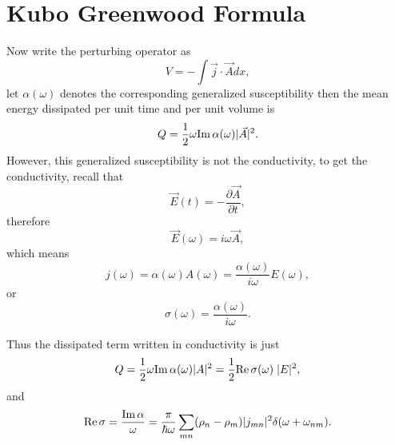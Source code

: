 \documentclass{book}
\renewcommand{\Re}{{\rm Re}}
\renewcommand{\Im}{{\rm Im}}
\numberwithin{equation}{section}
\begin{document}
\section{Kubo Greenwood Formula}
Now write the perturbing operator as
\begin{equation}
  V=-\int\vec{j}\cdot\vec{A}dx,
\end{equation}
let $\alpha(\omega)$ denotes the corresponding generalized
susceptibility then the mean energy dissipated per unit time and per
unit volume is
\begin{equation}
  Q=\frac{1}{2}\omega\Im\,\alpha(\omega)|\vec{A}|^2.
\end{equation}
However, this generalized susceptibility is not the conductivity, to
get the conductivity, recall that
\begin{equation}
  \vec{E}(t)=-\frac{\partial\vec{A}}{\partial t},
\end{equation}
therefore
\begin{equation}
  \vec{E}(\omega)=i\omega\vec{A},
\end{equation}
which means
\begin{equation}
  j(\omega)=\alpha(\omega)A(\omega)=\frac{\alpha(\omega)}{i\omega}E(\omega),
\end{equation}
or
\begin{equation}
  \sigma(\omega)=\frac{\alpha(\omega)}{i\omega}.
\end{equation}

Thus the dissipated term written in conductivity is just
\begin{equation}
  Q=\frac{1}{2}\omega\Im\,\alpha(\omega)|A|^2=\frac{1}{2}\Re\,\sigma(\omega)\;|E|^2,
\end{equation}
and
\begin{equation}
  \Re\,\sigma=\frac{\Im\,\alpha}{\omega}=
  \frac{\pi}{\hbar\omega}\sum_{mn}(\rho_n-\rho_m)
  |j_{mn}|^2\delta(\omega+\omega_{nm}).
\end{equation}
\end{document}
